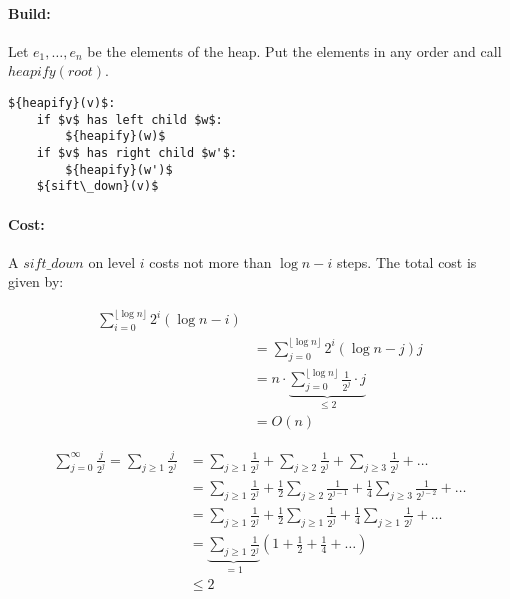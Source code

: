 \paragraph{Build: } Let $e_1, \ldots, e_n$ be the elements of the heap. Put the elements in any order and call ${heapify}({root})$.
\begin{lstlisting}[mathescape]
${heapify}(v)$:
    if $v$ has left child $w$:
        ${heapify}(w)$
    if $v$ has right child $w'$:
        ${heapify}(w')$
    ${sift\_down}(v)$
\end{lstlisting}

\paragraph{Cost: } A ${sift\_down}$ on level $i$ costs not more than $\log n -i$ steps. The total cost is given by:

\begin{align*}
\sum_{i = 0}^{\lfloor \log n \rfloor} 2^i (\log n - i) \\
& = \sum_{j = 0}^{\lfloor \log n \rfloor} 2^i (\log n - j) j \\
& = n \cdot \underbrace{\sum_{j = 0}^{\lfloor \log n \rfloor} \frac{1}{2^j} \cdot j}_{\le 2} \\
& = O(n)
\end{align*}

\begin{align*}
\sum_{j=0}^\infty \frac{j}{2^j} = \sum_{j \ge 1} \frac{j}{2^j} & = \sum_{j \ge 1} \frac{1}{2^j} + \sum_{j \ge 2} \frac{1}{2^j} + \sum_{j \ge 3} \frac{1}{2^j} + \ldots  \\
& = \sum_{j \ge 1} \frac{1}{2^j} + \frac{1}{2} \sum_{j \ge 2} \frac{1}{2^{j-1}} + \frac{1}{4} \sum_{j \ge 3} \frac{1}{2^{j-2}} + \ldots \\
& = \sum_{j \ge 1} \frac{1}{2^j} + \frac{1}{2} \sum_{j \ge 1} \frac{1}{2^j} + \frac{1}{4} \sum_{j \ge 1} \frac{1}{2^j} + \ldots \\
& = \underbrace{\sum_{j \ge 1} \frac{1}{2^j}}_{=1} \left ( 1 + \frac{1}{2} + \frac{1}{4} + \ldots \right ) \\
& \le 2
\end{align*}




